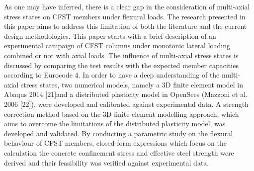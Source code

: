 As one may have inferred, there is a clear gap in the consideration of multi-axial stress states on CFST members under flexural loads. The research presented in this paper aims to address this limitation of both the literature and the current design methodologies. This paper starts with a brief description of an experimental campaign of CFST columns under monotonic lateral loading combined or not with axial loads. The influence of multi-axial stress states is discussed by comparing the test results with the expected member capacities according to Eurocode 4. In order to have a deep understanding of the multi-axial stress states, two numerical models, namely a 3D finite element model in Abaqus 2014 [21]and a distributed plasticity model in OpenSees (Mazzoni et al. 2006 [22]), were developed and calibrated against experimental data. A strength correction method based on the 3D finite element modelling approach, which aims to overcome the limitations of the distributed plasticity model, was developed and validated. By conducting a parametric study on the flexural behaviour of CFST members, closed-form expressions which focus on the calculation the concrete confinement stress and effective steel strength were derived and their feasibility was verified against experimental data. 
